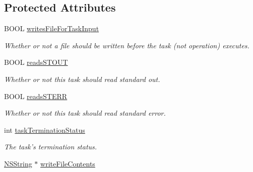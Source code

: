 \subsection*{Protected Attributes}
\begin{DoxyCompactItemize}
\item 
\hypertarget{interface_g_d_base_n_s_task_operation_afa260ac4d2b63a4b5e1febce15963f78}{
BOOL \hyperlink{interface_g_d_base_n_s_task_operation_afa260ac4d2b63a4b5e1febce15963f78}{writesFileForTaskInput}}
\label{interface_g_d_base_n_s_task_operation_afa260ac4d2b63a4b5e1febce15963f78}

\begin{DoxyCompactList}\small\item\em Whether or not a file should be written before the task (not operation) executes. \item\end{DoxyCompactList}\item 
\hypertarget{interface_g_d_base_n_s_task_operation_a8a6b5048cd0c4d92da16333426faa423}{
BOOL \hyperlink{interface_g_d_base_n_s_task_operation_a8a6b5048cd0c4d92da16333426faa423}{readsSTOUT}}
\label{interface_g_d_base_n_s_task_operation_a8a6b5048cd0c4d92da16333426faa423}

\begin{DoxyCompactList}\small\item\em Whether or not this task should read standard out. \item\end{DoxyCompactList}\item 
\hypertarget{interface_g_d_base_n_s_task_operation_a68e6b8393aad9f7f7f09b0413af9deb4}{
BOOL \hyperlink{interface_g_d_base_n_s_task_operation_a68e6b8393aad9f7f7f09b0413af9deb4}{readsSTERR}}
\label{interface_g_d_base_n_s_task_operation_a68e6b8393aad9f7f7f09b0413af9deb4}

\begin{DoxyCompactList}\small\item\em Whether or not this task should read standard error. \item\end{DoxyCompactList}\item 
\hypertarget{interface_g_d_base_n_s_task_operation_afc2b35a42f37a89d1b0a532a5049cea7}{
int \hyperlink{interface_g_d_base_n_s_task_operation_afc2b35a42f37a89d1b0a532a5049cea7}{taskTerminationStatus}}
\label{interface_g_d_base_n_s_task_operation_afc2b35a42f37a89d1b0a532a5049cea7}

\begin{DoxyCompactList}\small\item\em The task's termination status. \item\end{DoxyCompactList}\item 
\hypertarget{interface_g_d_base_n_s_task_operation_a8eb3d1e61308cd3ead705035a6aef306}{
\hyperlink{class_n_s_string}{NSString} $\ast$ \hyperlink{interface_g_d_base_n_s_task_operation_a8eb3d1e61308cd3ead705035a6aef306}{writeFileContents}}
\label{interface_g_d_base_n_s_task_operation_a8eb3d1e61308cd3ead705035a6aef306}


\end{DoxyCompactItemize}
